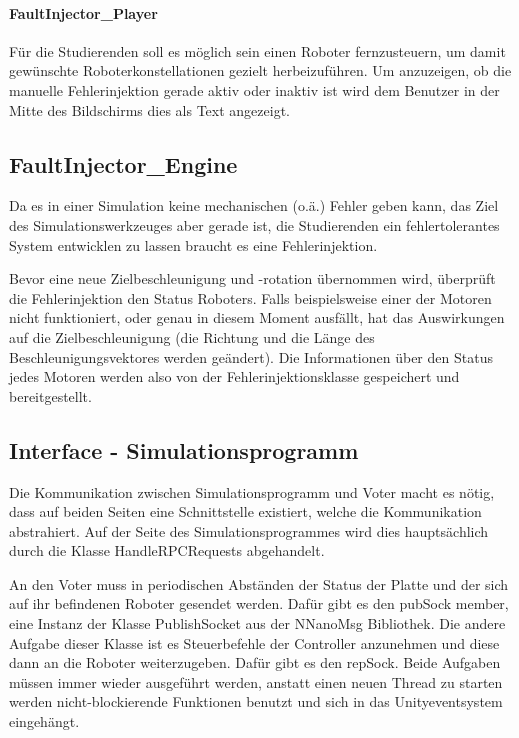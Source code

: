 \paragraph{FaultInjector\_Player} F{\"{u}}r die Studierenden soll es m{\"{o}}glich sein einen Roboter fernzusteuern, um damit
gew{\"{u}}nschte Roboterkonstellationen gezielt herbeizuf{\"{u}}hren. Um anzuzeigen, ob die manuelle Fehlerinjektion gerade aktiv
oder inaktiv ist wird dem Benutzer in der Mitte des Bildschirms dies als Text angezeigt.

\subsection{FaultInjector\_Engine}
Da es in einer Simulation keine mechanischen (o.{\"{a}}.) Fehler geben kann, das Ziel des Simulationswerkzeuges aber gerade ist,
die Studierenden ein fehlertolerantes System entwicklen zu lassen braucht es eine Fehlerinjektion.

Bevor eine neue Zielbeschleunigung und -rotation {\"{u}}bernommen wird, {\"{u}}berpr{\"{u}}ft die Fehlerinjektion den
Status Roboters. Falls beispielsweise einer der Motoren nicht funktioniert, oder genau in diesem Moment ausf{\"{a}}llt,
hat das Auswirkungen auf die Zielbeschleunigung (die Richtung und die L{\"{a}}nge des Beschleunigungsvektores werden
ge{\"{a}}ndert). Die Informationen {\"{u}}ber den Status jedes Motoren werden also von der Fehlerinjektionsklasse gespeichert und bereitgestellt.

\subsection{Interface - Simulationsprogramm}
Die Kommunikation zwischen Simulationsprogramm und Voter macht es n{\"{o}}tig, dass auf beiden Seiten eine Schnittstelle existiert,
welche die Kommunikation abstrahiert. Auf der Seite des Simulationsprogrammes wird dies haupts{\"{a}}chlich durch die Klasse
HandleRPCRequests abgehandelt.

An den Voter muss in periodischen Abst{\"{a}}nden der Status der Platte und der sich auf ihr befindenen Roboter gesendet werden.
Daf{\"{u}}r gibt es den pubSock member, eine Instanz der Klasse PublishSocket aus der NNanoMsg Bibliothek. Die andere Aufgabe
dieser Klasse ist es Steuerbefehle der Controller anzunehmen und diese dann an die Roboter weiterzugeben. Daf{\"{u}}r gibt es
den repSock. Beide Aufgaben m{\"{u}}ssen immer wieder ausgef{\"{u}}hrt werden, anstatt einen neuen Thread zu starten werden
nicht-blockierende Funktionen benutzt und sich in das Unityeventsystem eingeh{\"{a}}ngt.

